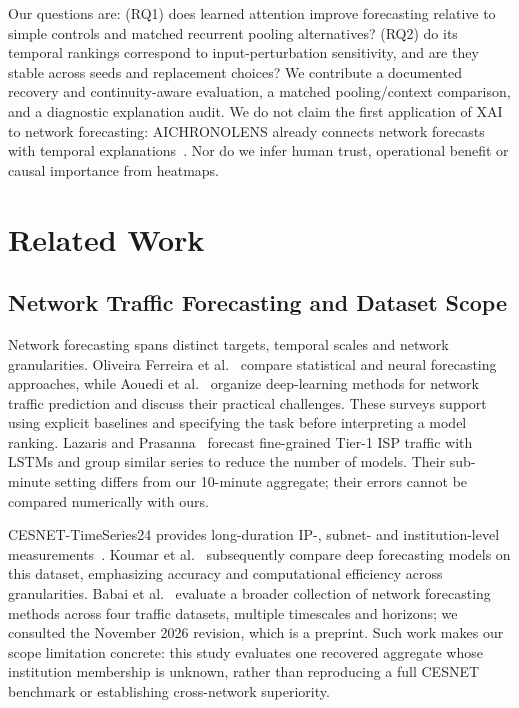 \documentclass[conference]{IEEEtran}
\begin{document}
Our questions are: (RQ1) does learned attention improve forecasting relative to simple controls and matched recurrent pooling alternatives? (RQ2) do its temporal rankings correspond to input-perturbation sensitivity, and are they stable across seeds and replacement choices? We contribute a documented recovery and continuity-aware evaluation, a matched pooling/context comparison, and a diagnostic explanation audit. We do not claim the first application of XAI to network forecasting: AICHRONOLENS already connects network forecasts with temporal explanations~\cite{aichronolens}. Nor do we infer human trust, operational benefit or causal importance from heatmaps.

\section{Related Work}
\subsection{Network Traffic Forecasting and Dataset Scope}
Network forecasting spans distinct targets, temporal scales and network granularities. Oliveira Ferreira et al.~\cite{survey} compare statistical and neural forecasting approaches, while Aouedi et al.~\cite{ntp_survey} organize deep-learning methods for network traffic prediction and discuss their practical challenges. These surveys support using explicit baselines and specifying the task before interpreting a model ranking. Lazaris and Prasanna~\cite{network_lstm} forecast fine-grained Tier-1 ISP traffic with LSTMs and group similar series to reduce the number of models. Their sub-minute setting differs from our 10-minute aggregate; their errors cannot be compared numerically with ours.

CESNET-TimeSeries24 provides long-duration IP-, subnet- and institution-level measurements~\cite{cesnet}. Koumar et al.~\cite{cesnet_comparison} subsequently compare deep forecasting models on this dataset, emphasizing accuracy and computational efficiency across granularities. Babai et al.~\cite{which_deep} evaluate a broader collection of network forecasting methods across four traffic datasets, multiple timescales and horizons; we consulted the November 2026 revision, which is a preprint. Such work makes our scope limitation concrete: this study evaluates one recovered aggregate whose institution membership is unknown, rather than reproducing a full CESNET benchmark or establishing cross-network superiority.
\end{document}
